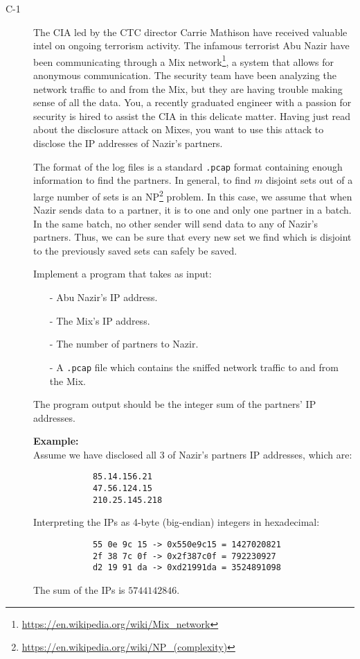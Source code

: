 \documentclass{article}
\begin{document}
\begin{description}
	\item[C-1]{The CIA led by the CTC director Carrie Mathison have received valuable intel on ongoing terrorism activity.
		The infamous terrorist Abu Nazir have been communicating through a Mix network\footnote{\url{https://en.wikipedia.org/wiki/Mix_network}}, 
		a system that allows for anonymous communication. The security team have been analyzing the network traffic to and from the Mix, but
		they are having trouble making sense of all the data. You, a recently graduated engineer with a passion for security is hired to assist
		the CIA in this delicate matter. Having just read about the disclosure attack on Mixes, you want to use this attack to disclose the
		IP addresses of Nazir's partners. 
		
		The format of the log files is a standard \texttt{.pcap} format containing enough information
		to find the partners. In general, to find $m$ disjoint sets out of a large number of sets is an 
		NP\footnote{\url{https://en.wikipedia.org/wiki/NP_(complexity)}} problem. In this case, we assume that when Nazir sends data to a partner,
		it is to one and only one partner in a batch. In the same batch, no other sender will send data to any of Nazir's partners. Thus,
		we can be sure that every new set we find which is disjoint to the previously saved sets can safely be saved.

		Implement a program that takes as input:
		\begin{itemize}
			\item[-] Abu Nazir's IP address.
			\item[-] The Mix's IP address.
			\item[-] The number of partners to Nazir.
			\item[-] A \texttt{.pcap} file which contains the sniffed network traffic to and from the Mix.
		\end{itemize}
		The program output should be the integer sum of the partners' IP addresses.

		\textbf{Example:}\\
		Assume we have disclosed all 3 of Nazir's partners IP addresses, which are:
		\begin{verbatim}
			85.14.156.21
			47.56.124.15
			210.25.145.218
		\end{verbatim}
		Interpreting the IPs as 4-byte (big-endian) integers in hexadecimal:
		\begin{verbatim}
			55 0e 9c 15 -> 0x550e9c15 = 1427020821
			2f 38 7c 0f -> 0x2f387c0f = 792230927
			d2 19 91 da -> 0xd21991da = 3524891098
		\end{verbatim}
		The sum of the IPs is $5744142846$.

}
\end{description}
\end{document}
